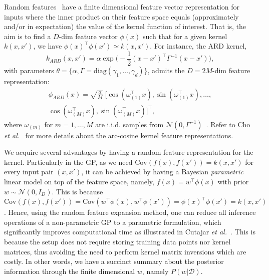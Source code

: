 \documentclass[conference]{IEEEtran}
\begin{document}
Random features~\cite{rf_fourier,rf_arccos} have a finite dimensional feature vector representation for inputs where the inner product on their feature space equals (approximately and/or in expectation) the value of the kernel function of interest. That is, the aim is to find a $D$-dim feature vector $\phi(x)$ such that for a given kernel $k(x,x')$, we have $\phi(x)^\top \phi(x') \simeq k(x,x')$. For instance, the ARD kernel,
\begin{equation}
k_{ARD}(x,x') = \alpha \exp \Big( -\frac{1}{2}(x-x')^\top \Gamma^{-1} (x-x') \Big),
\label{eq:kernel_ard}
\end{equation}
with parameters $\theta = \{ \alpha,
\Gamma=\textrm{diag}(\gamma_1,\dots,\gamma_d) \}$, 
admits the $D=2M$-dim feature representation: 
\begin{equation}
\begin{split}
\phi_{ARD}(x) = \sqrt{\frac{\alpha}{M}} \ \Big[
  \cos(\omega_{(1)}^\top x), \sin(\omega_{(1)}^\top x), \dots, \\
  \cos(\omega_{(M)}^\top x), \sin(\omega_{(M)}^\top x) \Big]^\top,
\end{split}
\label{eq:rf_ard}
\end{equation}
where $\omega_{(m)}$ for $m=1,\dots,M$ are i.i.d. samples from 
$\mathcal{N}(0, \Gamma^{-1})$~\cite{rf_fourier}. Refer to Cho {\em et al.}~\cite{rf_arccos} for more details about the arc-cosine kernel feature representations. 

We acquire several advantages by having a random feature representation for the kernel. Particularly in the GP, as we need $\textrm{Cov}(f(x),f(x')) = k(x,x')$ for every input pair $(x, x')$, it can be achieved by having a Bayesian {\em parametric} linear model on top of the feature space, namely, 
$f(x) = w^\top \phi(x)$ with prior $w \sim \mathcal{N}(0, I_D)$. This is because 
$\textrm{Cov}(f(x),f(x')) = \textrm{Cov}(w^\top \phi(x), w^\top \phi(x')) = 
\phi(x)^\top \phi(x') = k(x,x')$. Hence, using the random feature expansion method, one can reduce all inference operations of a non-parametric GP to a parametric formulation, which significantly improves computational time as illustrated in Cutajar {\em et al.}~\cite{rfdnn17}. This is because the setup does not require storing training data points nor kernel matrices, thus avoiding the need to perform kernel matrix inversions which are costly. In other words, we have a succinct summary about the posterior information through the finite dimensional $w$, namely $P(w|\mathcal{D})$.
\end{document}
